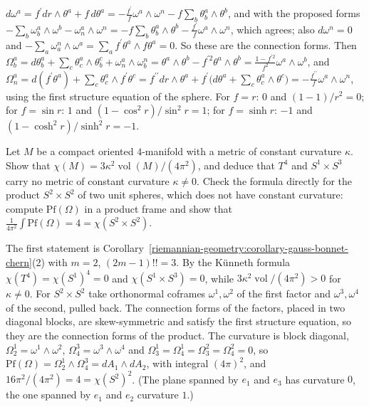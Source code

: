 \begin{solution}
$d\omega^a = f^{\prime}dr \wedge \theta^a + f\,d\theta^a = -\frac{f^{\prime}}{f}\omega^a \wedge \omega^n - f\sum_b\theta^a_b \wedge \theta^b$, and with the proposed forms
$-\sum_b\omega^a_b \wedge \omega^b - \omega^a_n \wedge \omega^n = -f\sum_b\theta^a_b \wedge \theta^b - \frac{f^{\prime}}{f}\omega^a \wedge \omega^n$, which agrees; also $d\omega^n = 0$ and
$-\sum_a\omega^n_a \wedge \omega^a = \sum_af^{\prime}\theta^a \wedge f\theta^a = 0$. So these are the connection forms. Then
$\Omega^a_b = d\theta^a_b + \sum_c\theta^a_c \wedge \theta^c_b + \omega^a_n \wedge \omega^n_b = \theta^a \wedge \theta^b - f^{\prime2}\theta^a \wedge \theta^b = \frac{1 - f^{\prime2}}{f^2}\omega^a \wedge \omega^b$, and
$\Omega^a_n = d(f^{\prime}\theta^a) + \sum_c\theta^a_c \wedge f^{\prime}\theta^c = f^{\prime\prime}dr \wedge \theta^a + f^{\prime}\bigl(d\theta^a + \sum_c\theta^a_c \wedge \theta^c\bigr) = -\frac{f^{\prime\prime}}{f}\omega^a \wedge \omega^n$, using the
first structure equation of the sphere. For $f = r$: $0$ and $(1 - 1)/r^2 = 0$; for $f = \sin r$: $1$ and $(1 - \cos^2r)/\sin^2r = 1$; for $f = \sinh r$: $-1$ and $(1 - \cosh^2r)/\sinh^2r = -1$.
\end{solution}

\begin{exercise}\label{riemannian-geometry:exercise-gbc-dimension-four}
Let $M$ be a compact oriented $4$-manifold with a metric of constant curvature $\kappa$. Show that $\chi(M) = 3\kappa^2\operatorname{vol}(M)/(4\pi^2)$, and deduce that $T^4$ and $S^1 \times S^3$ carry no metric of
constant curvature $\kappa \neq 0$. Check the formula directly for the product $S^2 \times S^2$ of two unit spheres, which does not have constant curvature: compute $\mathrm{Pf}(\Omega)$ in a product
frame and show that $\frac{1}{4\pi^2}\int\mathrm{Pf}(\Omega) = 4 = \chi(S^2 \times S^2)$.
\end{exercise}

\begin{solution}
The first statement is Corollary~\ref{riemannian-geometry:corollary-gauss-bonnet-chern}(2) with $m = 2$, $(2m-1)!! = 3$. By the K\"unneth formula $\chi(T^4) = \chi(S^1)^4 = 0$ and
$\chi(S^1 \times S^3) = 0$, while $3\kappa^2\operatorname{vol}/(4\pi^2) > 0$ for $\kappa \neq 0$. For $S^2 \times S^2$ take orthonormal coframes $\omega^1, \omega^2$ of the first factor and $\omega^3, \omega^4$ of the
second, pulled back. The connection forms of the factors, placed in two diagonal blocks, are skew-symmetric and satisfy the first structure equation, so they are the connection forms of
the product. The curvature is block diagonal, $\Omega^1_2 = \omega^1 \wedge \omega^2$, $\Omega^3_4 = \omega^3 \wedge \omega^4$ and $\Omega^1_3 = \Omega^1_4 = \Omega^2_3 = \Omega^2_4 = 0$, so
$\mathrm{Pf}(\Omega) = \Omega^1_2 \wedge \Omega^3_4 = dA_1 \wedge dA_2$, with integral $(4\pi)^2$, and $16\pi^2/(4\pi^2) = 4 = \chi(S^2)^2$. (The plane spanned by $e_1$ and $e_3$ has curvature $0$, the
one spanned by $e_1$ and $e_2$ curvature $1$.)
\end{solution}


